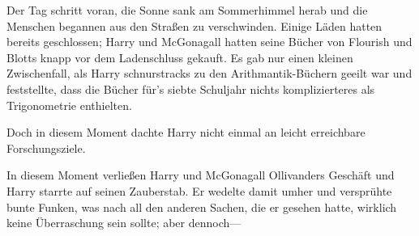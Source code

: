Der Tag schritt voran, die Sonne sank am Sommerhimmel herab und die Menschen begannen aus den Straßen zu verschwinden. Einige Läden hatten bereits geschlossen; Harry und McGonagall hatten seine Bücher von Flourish und Blotts knapp vor dem Ladenschluss gekauft. Es gab nur einen kleinen Zwischenfall, als Harry schnurstracks zu den Arithmantik-Büchern geeilt war und feststellte, dass die Bücher für’s siebte Schuljahr nichts komplizierteres als Trigonometrie enthielten.

Doch in diesem Moment dachte Harry nicht einmal an leicht erreichbare Forschungsziele.

In diesem Moment verließen Harry und McGonagall Ollivanders Geschäft und Harry starrte auf seinen Zauberstab. Er wedelte damit umher und versprühte bunte Funken, was nach all den anderen Sachen, die er gesehen hatte, wirklich keine Überraschung sein sollte; aber dennoch—

